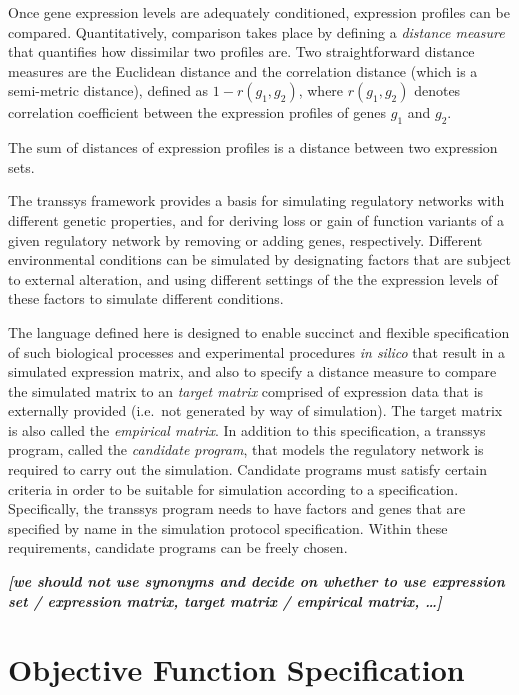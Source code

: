\documentclass[a4paper,fleqn]{article}
\newcommand{\newterm}[1]{\emph{#1}}
\newcommand{\todo}[1]{\rule{0pt}{0pt}\marginpar{\rule{1ex}{1ex}}\textbf{\emph{[#1]}}}
\newcommand{\otherlang}[1]{\textit{#1}}
\begin{document}
Once gene expression levels are adequately conditioned, expression
profiles can be compared. Quantitatively, comparison takes place by
defining a \newterm{distance measure} that quantifies how dissimilar
two profiles are. Two straightforward distance measures are the
Euclidean distance and the correlation distance (which is a
semi-metric distance), defined as $1 - r(g_1, g_2)$, where $r(g_1,
g_2)$ denotes correlation coefficient between the expression profiles
of genes $g_1$ and $g_2$.

The sum of distances of expression profiles is a distance between two
expression sets.

The transsys framework provides a basis for simulating regulatory
networks with different genetic properties, and for deriving loss or
gain of function variants of a given regulatory network by removing or
adding genes, respectively. Different environmental conditions can be
simulated by designating factors that are subject to external
alteration, and using different settings of the the expression levels
of these factors to simulate different conditions.

The language defined here is designed to enable succinct and flexible
specification of such biological processes and experimental procedures
\otherlang{in silico} that result in a simulated expression matrix,
and also to specify a distance measure to compare the simulated matrix
to an \newterm{target matrix} comprised of expression data that is
externally provided (i.e.\ not generated by way of simulation). The
target matrix is also called the \newterm{empirical matrix}. In
addition to this specification, a transsys program, called the
\newterm{candidate program}, that models the regulatory network is
required to carry out the simulation. Candidate programs must satisfy
certain criteria in order to be suitable for simulation according to a
specification. Specifically, the transsys program needs to have
factors and genes that are specified by name in the simulation
protocol specification. Within these requirements, candidate programs
can be freely chosen.

\todo{we should not use synonyms and decide on whether to use
  expression set / expression matrix, target matrix / empirical
  matrix, \ldots}


\section{Objective Function Specification}
\end{document}
